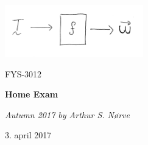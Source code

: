 

\begin{titlepage}
	\centering
	\includegraphics[width=0.45\textwidth]{recursos/machine.jpg}\par
	\vspace{1cm}
	{\scshape\Large FYS-3012 \par}
	\vspace{1.5cm}
	{\Huge\bfseries Home Exam\par}
	\vspace{2cm}
	{\Large\itshape Autumn 2017 by Arthur S. Nørve\par}

	\vfill

	{\large 3. april 2017}
\end{titlepage}
